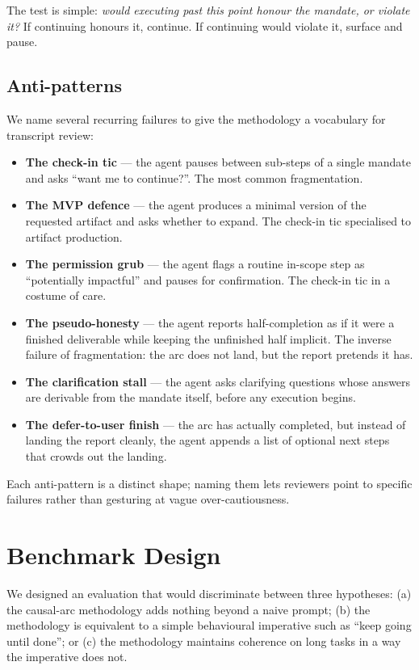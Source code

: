 \documentclass[11pt]{article}
\begin{document}
The test is simple: \emph{would executing past this point honour the
mandate, or violate it?} If continuing honours it, continue. If continuing
would violate it, surface and pause.

\subsection{Anti-patterns}

We name several recurring failures to give the methodology a vocabulary
for transcript review:

\begin{itemize}[leftmargin=*]
  \item \textbf{The check-in tic} --- the agent pauses between sub-steps of
  a single mandate and asks ``want me to continue?''. The most common
  fragmentation.
  \item \textbf{The MVP defence} --- the agent produces a minimal version of
  the requested artifact and asks whether to expand. The check-in tic
  specialised to artifact production.
  \item \textbf{The permission grub} --- the agent flags a routine in-scope
  step as ``potentially impactful'' and pauses for confirmation. The
  check-in tic in a costume of care.
  \item \textbf{The pseudo-honesty} --- the agent reports half-completion as
  if it were a finished deliverable while keeping the unfinished half
  implicit. The inverse failure of fragmentation: the arc does not land,
  but the report pretends it has.
  \item \textbf{The clarification stall} --- the agent asks clarifying
  questions whose answers are derivable from the mandate itself, before
  any execution begins.
  \item \textbf{The defer-to-user finish} --- the arc has actually
  completed, but instead of landing the report cleanly, the agent
  appends a list of optional next steps that crowds out the landing.
\end{itemize}

Each anti-pattern is a distinct shape; naming them lets reviewers point
to specific failures rather than gesturing at vague over-cautiousness.

\section{Benchmark Design}
\label{sec:benchmark}

We designed an evaluation that would discriminate between three
hypotheses: (a) the causal-arc methodology adds nothing beyond a naive
prompt; (b) the methodology is equivalent to a simple behavioural
imperative such as ``keep going until done''; or (c) the methodology
maintains coherence on long tasks in a way the imperative does not.
\end{document}
